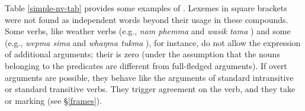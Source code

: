 Table \ref{simple-nv-tab} provides some examples of . Lexemes in square brackets were not found as independent words beyond their usage in these compounds. Some verbs, like weather verbs (e.g., \emph{nam phemma}  and \emph{wasik tama} ) and some  (e.g.,  \emph{wepma sima}  and \emph{whaŋma tukma} ), for instance, do not allow the expression of additional arguments; their  is zero (under the assumption that the nouns belonging to the predicates are different from full-fledged arguments). If overt arguments are possible, they behave like the arguments of standard intransitive or standard transitive verbs. They trigger agreement on the verb, and they take  or   marking (see §\ref{frames}). 


